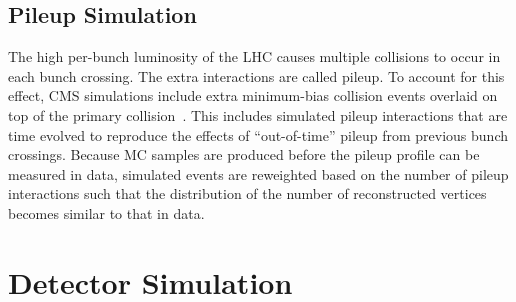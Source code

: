 \subsection{Pileup Simulation}

The high per-bunch luminosity of the LHC causes multiple collisions to occur in each bunch crossing.
The extra interactions are called pileup.
To account for this effect, CMS simulations include extra minimum-bias collision events overlaid on top of the primary collision~\cite{Banerjee:1742-6596-396-2-022003,Hildreth:1742-6596-664-7-072022}.
This includes simulated pileup interactions that are time evolved to reproduce the effects of ``out-of-time'' pileup from previous bunch crossings.
Because MC samples are produced before the pileup profile can be measured in data, simulated events are reweighted based on the number of pileup interactions such that the distribution of the number of reconstructed vertices becomes similar to that in data.


\section{Detector Simulation}
